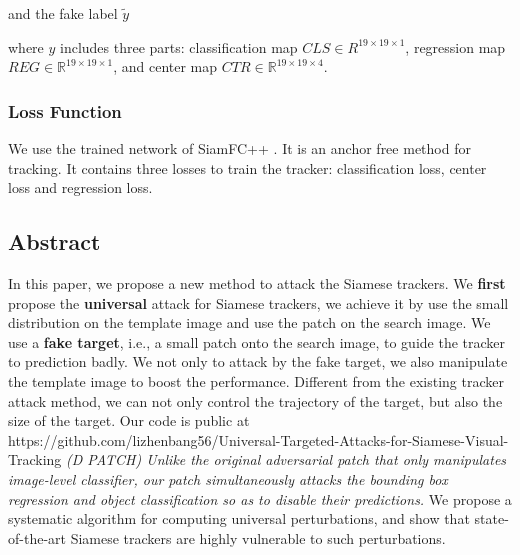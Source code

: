 \documentclass{article}
\begin{document}
and the fake label $\tilde y$

where $y$ includes three parts: classification map $CLS \in R^{19 \times 19 \times 1}$, regression map $REG \in \mathbb{R}^{19 \times 19 \times 1}$, and center map $CTR \in \mathbb{R}^{19 \times 19 \times 4}$.

\subsubsection{Loss Function}

We use the trained network of SiamFC++ \cite{SiamFC++}.
It is an anchor free method for tracking. It contains three losses to train the tracker: classification loss, center loss and regression loss.

\subsection{Abstract}

In this paper, we propose a new method to attack the Siamese trackers. 
We \textbf{first} propose the \textbf{universal} attack for Siamese trackers, we achieve it by use the small distribution on the template image and use the patch on the search image.
We use a \textbf{fake target}, i.e., a small patch onto the search image, to guide the tracker to prediction badly.
We not only to attack by the fake target, we also manipulate the template image to boost the performance.
Different from the existing tracker attack method, we can not only control the trajectory of the target, but also the size of the target.
Our code is public at https://github.com/lizhenbang56/Universal-Targeted-Attacks-for-Siamese-Visual-Tracking
\textit{(D PATCH) Unlike the original adversarial patch that only manipulates image-level classifier, our patch simultaneously attacks the bounding box regression and object classification so as to disable their predictions.}
We propose a systematic algorithm for computing universal perturbations, and show that state-of-the-art Siamese trackers are highly vulnerable to such perturbations.
\end{document}
